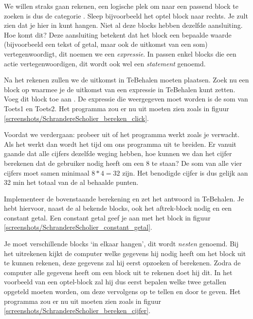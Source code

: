 We willen straks gaan rekenen, een logische plek om naar een passend block te zoeken is dus de categorie . Sleep bijvoorbeeld het optel block naar rechts. Je zult zien dat je hier  in kunt hangen. Niet al deze blocks hebben dezelfde aansluiting. Hoe komt dit? Deze aansluiting betekent dat het block een bepaalde waarde (bijvoorbeeld een tekst of getal, maar ook de uitkomst van een som) vertegenwoordigt, dit noemen we een \emph{expressie}. In  passen enkel blocks die een actie vertegenwoordigen, dit wordt ook wel een \emph{statement} genoemd. 

\begin{opgave}
    \opgVraag
Na het rekenen zullen we de uitkomst in TeBehalen moeten plaatsen. Zoek nu een block op waarmee je de uitkomst van een expressie in TeBehalen kunt zetten. Voeg dit block toe aan . De expressie die weergegeven moet worden is de som van Toets1 en Toets2. 
    \opgUitwerking
    Het programma zou er nu uit moeten zien zoals in figuur \ref{screenshots/SchrandereScholier_bereken_click}.
\end{opgave}

\runOpTelefoon{} Voordat we verdergaan: probeer uit of het programma werkt zoals je verwacht. Als het werkt dan wordt het tijd om ons programma uit te breiden. Er vanuit gaande dat alle cijfers dezelfde weging hebben, hoe kunnen we dan het cijfer berekenen dat de gebruiker nodig heeft om een 8 te staan? De som van alle vier cijfers moet samen minimaal $8*4=32$ zijn. Het benodigde cijfer is dus gelijk aan 32 min het totaal van de al behaalde punten.
 
 \begin{opgave}
    \opgVraag
Implementeer de bovenstaande berekening en zet het antwoord in TeBehalen. Je hebt hiervoor, naast de al bekende blocks, ook het aftrek-block nodig en een constant getal. Een constant getal geef je aan met het block in figuur  \ref{screenshots/SchrandereScholier_constant_getal}. 

Je moet verschillende blocks `in elkaar hangen', dit wordt \emph{nesten} genoemd. Bij het uitrekenen kijkt de computer welke gegevens hij nodig heeft om het block uit te kunnen rekenen, deze gegevens zal hij eerst opzoeken of berekenen. Zodra de computer alle gegevens heeft om een block uit te rekenen doet hij dit. In het voorbeeld van een optel-block zal hij dus eerst bepalen welke twee getallen opgeteld moeten worden, om deze vervolgens op te tellen en door te geven.
    \opgUitwerking
    Het programma zou er nu uit moeten zien zoals in figuur \ref{screenshots/SchrandereScholier_bereken_cijfer}.
\end{opgave}

